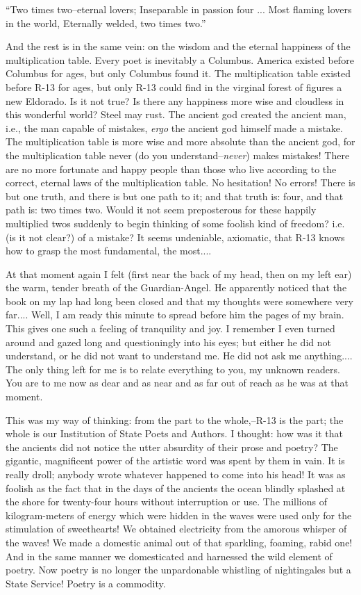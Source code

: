 \documentclass[11pt,openany]{book}
\begin{document}
``Two times two--eternal lovers; Inseparable in passion four ... Most flaming lovers in the world, Eternally welded, two times two.''

And the rest is in the same vein: on the wisdom and the eternal happiness of the multiplication table. Every poet is inevitably a Columbus. America existed before Columbus for ages, but only Columbus found it. The multiplication table existed before R-13 for ages, but only R-13 could find in the virginal forest of figures a new Eldorado. Is it not true? Is there any happiness more wise and cloudless in this wonderful world? Steel may rust. The ancient god created the ancient man, i.e., the man capable of mistakes, \emph{ergo} the ancient god himself made a mistake. The multiplication table is more wise and more absolute than the ancient god, for the multiplication table never (do you understand--\emph{never}) makes mistakes! There are no more fortunate and happy people than those who live according to the correct, eternal laws of the multiplication table. No hesitation! No errors! There is but one truth, and there is but one path to it; and that truth is: four, and that path is: two times two. Would it not seem preposterous for these happily multiplied twos suddenly to begin thinking of some foolish kind of freedom? i.e. (is it not clear?) of a mistake? It seems undeniable, axiomatic, that R-13 knows how to grasp the most fundamental, the most....

At that moment again I felt (first near the back of my head, then on my left ear) the warm, tender breath of the Guardian-Angel. He apparently noticed that the book on my lap had long been closed and that my thoughts were somewhere very far.... Well, I am ready this minute to spread before him the pages of my brain. This gives one such a feeling of tranquility and joy. I remember I even turned around and gazed long and questioningly into his eyes; but either he did not understand, or he did not want to understand me. He did not ask me anything.... The only thing left for me is to relate everything to you, my unknown readers. You are to me now as dear and as near and as far out of reach as he was at that moment.

This was my way of thinking: from the part to the whole,--R-13 is the part; the whole is our Institution of State Poets and Authors. I thought: how was it that the ancients did not notice the utter absurdity of their prose and poetry? The gigantic, magnificent power of the artistic word was spent by them in vain. It is really droll; anybody wrote whatever happened to come into his head! It was as foolish as the fact that in the days of the ancients the ocean blindly splashed at the shore for twenty-four hours without interruption or use. The millions of kilogram-meters of energy which were hidden in the waves were used only for the stimulation of sweethearts! We obtained electricity from the amorous whisper of the waves! We made a domestic animal out of that sparkling, foaming, rabid one! And in the same manner we domesticated and harnessed the wild element of poetry. Now poetry is no longer the unpardonable whistling of nightingales but a State Service! Poetry is a commodity.
\end{document}
